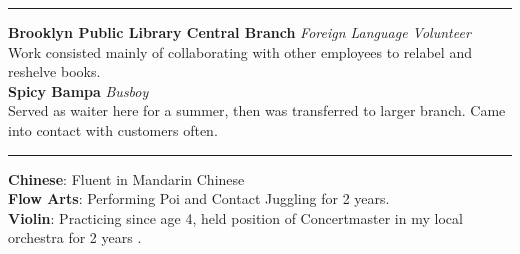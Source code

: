 \documentclass[14, .75in]{article}
\begin{document}
  \vspace{0.1cm} \hrule \vspace{0.3cm}
  \noindent\textbf{Brooklyn Public Library Central Branch}\textit{ Foreign Language Volunteer}\\
  Work consisted mainly of collaborating with other employees to relabel and reshelve books.\\
  \textbf{Spicy Bampa}\textit{ Busboy}\\
  Served as waiter here for a summer, then was transferred to larger branch. Came into contact with customers often.



  \vspace{0.1cm} \hrule \vspace{0.3cm}
  \noindent\textbf{Chinese}: Fluent in Mandarin Chinese\\
  \textbf{Flow Arts}: Performing Poi and Contact Juggling for 2 years.\\
  \textbf{Violin}: Practicing since age 4, held position of Concertmaster in my local orchestra for 2 years .
\end{document}
